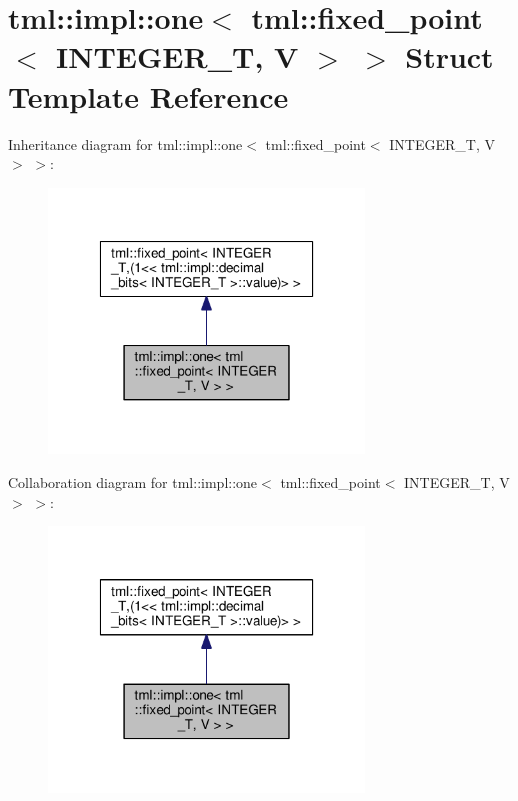 \hypertarget{structtml_1_1impl_1_1one_3_01tml_1_1fixed__point_3_01_i_n_t_e_g_e_r___t_00_01_v_01_4_01_4}{\section{tml\+:\+:impl\+:\+:one$<$ tml\+:\+:fixed\+\_\+point$<$ I\+N\+T\+E\+G\+E\+R\+\_\+\+T, V $>$ $>$ Struct Template Reference}
\label{structtml_1_1impl_1_1one_3_01tml_1_1fixed__point_3_01_i_n_t_e_g_e_r___t_00_01_v_01_4_01_4}
}


Inheritance diagram for tml\+:\+:impl\+:\+:one$<$ tml\+:\+:fixed\+\_\+point$<$ I\+N\+T\+E\+G\+E\+R\+\_\+\+T, V $>$ $>$\+:
\nopagebreak
\begin{figure}[H]
\begin{center}
\leavevmode
\includegraphics[width=238pt]{structtml_1_1impl_1_1one_3_01tml_1_1fixed__point_3_01_i_n_t_e_g_e_r___t_00_01_v_01_4_01_4__inherit__graph}
\end{center}
\end{figure}


Collaboration diagram for tml\+:\+:impl\+:\+:one$<$ tml\+:\+:fixed\+\_\+point$<$ I\+N\+T\+E\+G\+E\+R\+\_\+\+T, V $>$ $>$\+:
\nopagebreak
\begin{figure}[H]
\begin{center}
\leavevmode
\includegraphics[width=238pt]{structtml_1_1impl_1_1one_3_01tml_1_1fixed__point_3_01_i_n_t_e_g_e_r___t_00_01_v_01_4_01_4__coll__graph}
\end{center}
\end{figure}
